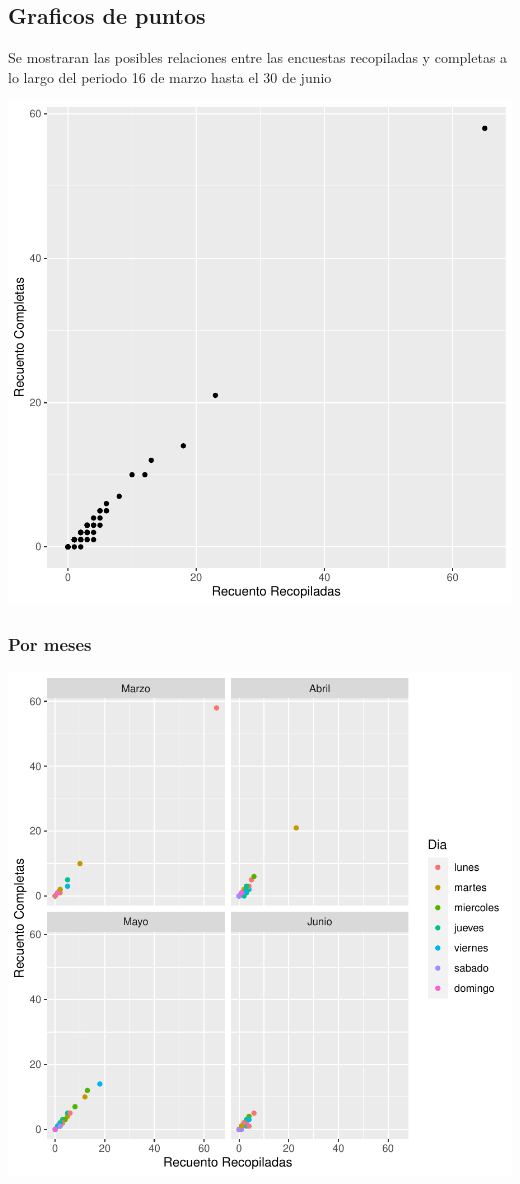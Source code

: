 \documentclass{article}
\begin{document}
\subsection{Graficos de puntos}
Se mostraran las posibles relaciones entre las encuestas recopiladas y completas a lo largo del periodo 16 de marzo hasta el 30 de junio

\includegraphics{seguimento2-040}

\subsubsection{Por meses}

\includegraphics{seguimento2-041}
\end{document}

